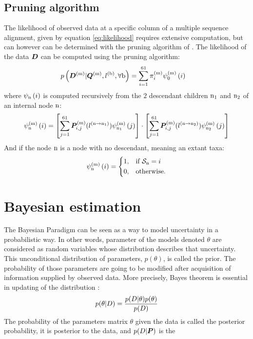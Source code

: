 \subsection{Pruning algorithm}
The \gls{likelihood} of observed data at a specific column of a multiple sequence alignment, given by equation \ref{eq:likelihood} requires extensive computation, but can however can be determined with the pruning algorithm of \citet{Felsenstein1985}. 
The \gls{likelihood} of the data $\bm{D}$ can be computed using the pruning algorithm:
\begin{align}
p\left(\bm{D}^{(\text{m})}| \bm{Q}^{(\text{m})}, l^{(\text{b})}, \forall \text{b} \right) & = \sum\limits_{{i}=1}^{61} \pi^{(\text{m})}_{{i}} \psi^{(\text{m})}_{0} \left( {i} \right)
\end{align}
where $\psi_{\text{n}} \left( {i} \right)$ is computed recursively from the $2$ descendant children $\text{n}_{1}$ and $\text{n}_{2}$ of an internal node $\text{n}$:
\begin{align}
\psi^{(\text{m})}_{\text{n}} \left( {i} \right) = 
\left[ \sum\limits_{{j}=1}^{61}\bm{P}^{(\text{m})}_{{i}, {j}}(l^{(\text{n} \to \text{n}_{1})}) \psi^{(\text{m})}_{\text{n}_{1}} \left( {j} \right) \right]
\cdot 
\left[ \sum\limits_{{j}=1}^{61}\bm{P}^{(\text{m})}_{{i}, {j}}(l^{(\text{n} \to \text{n}_{2})}) \psi^{(\text{m})}_{\text{n}_{2}} \left( {j} \right) \right]
\end{align}
And if the node $\text{n}$ is a node with no descendant, meaning an extant taxa:
\begin{align}
\psi^{(\text{m})}_{\text{n}} \left( {i} \right) =
\begin{dcases}
1, & \text{if } \mathcal{S}_{\text{n}} = {i} \\
0, & \text{otherwise.}
\end{dcases}
\end{align}

\section{Bayesian estimation}
The Bayesian Paradigm can be seen as a way to model uncertainty in a probabilistic way.
In other words, parameter of the models denoted $\theta$ are considered as random variables whose distribution describes that uncertainty.
This unconditional distribution of parameters, $p(\theta)$, is called the \gls{prior}.
The probability of those parameters are going to be modified after acquisition of information supplied by observed data.
More precisely, Bayes theorem is essential in updating of the distribution :
\begin{equation}
	p(\theta|D)=\frac{p(D|\theta)p(\theta)}{p(D)}
\end{equation}
The probability of the parameters matrix $\theta$ given the data is called the \gls{posterior} probability, it is \gls{posterior} to the data, and $p(D|\bm{P})$ is the 

